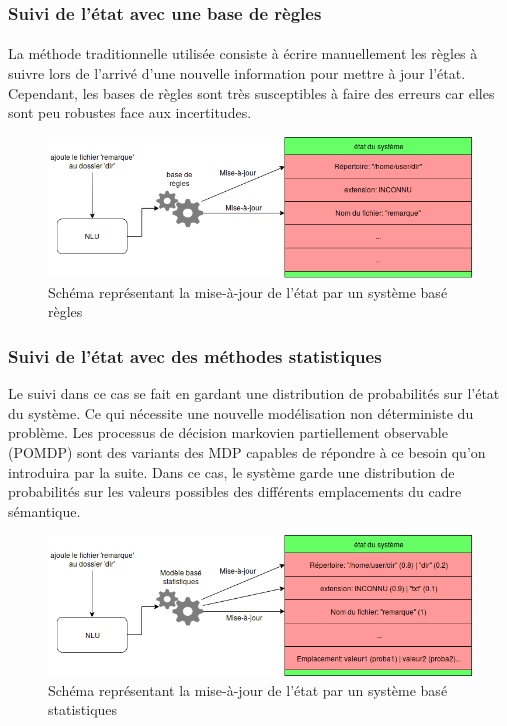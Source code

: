 \subsubsection{Suivi de l’état avec une base de règles}\label{suivi}
\paragraph{}
La méthode traditionnelle utilisée consiste à écrire manuellement les règles à suivre lors de l’arrivé d’une nouvelle information pour mettre à jour l’état\cite{Goddeau1996}. Cependant, les bases de règles sont très susceptibles à faire des erreurs\cite{Chen2017} car elles sont peu robustes face aux incertitudes.


\begin{figure}[H]
	\centering
	\includegraphics[width=.7\linewidth]{images/DM/RuleBasedUpdate.png} 
	\caption{Schéma représentant la mise-à-jour de l'état par un système basé règles} 
\end{figure}

\subsubsection{Suivi de l’état avec des méthodes statistiques}
Le suivi dans ce cas se fait en gardant une distribution de probabilités sur l’état du système. Ce qui nécessite une nouvelle modélisation non déterministe du problème. Les processus de décision markovien partiellement observable (POMDP)\cite{Young2010} sont des variants des MDP capables de répondre à ce besoin qu’on introduira par la suite. Dans ce cas, le système garde une distribution de probabilités sur les valeurs possibles des différents emplacements du cadre sémantique.

\begin{figure}[H]
	\centering
	\includegraphics[width=.7\linewidth]{images/DM/StatBasedUpdate.png} 
	\caption{Schéma représentant la mise-à-jour de l'état par un système basé statistiques} 
\end{figure}

